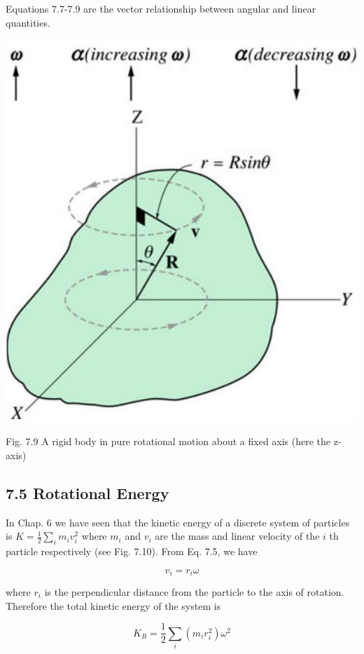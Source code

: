 \documentclass[10pt]{article}
\begin{document}
Equations 7.7-7.9 are the vector relationship between angular and linear quantities.

\begin{center}
\includegraphics[max width=\textwidth]{2024_09_13_db1f357d2aad0a03eb2eg-116}
\end{center}

Fig. 7.9 A rigid body in pure rotational motion about a fixed axis (here the z-axis)

\subsection*{7.5 Rotational Energy}
In Chap. 6 we have seen that the kinetic energy of a discrete system of particles is $K=\frac{1}{2} \sum_{i} m_{i} v_{i}^{2}$ where $m_{i}$ and $v_{i}$ are the mass and linear velocity of the $i$ th particle respectively (see Fig. 7.10). From Eq. 7.5, we have

$$
v_{i}=r_{i} \omega
$$

where $r_{i}$ is the perpendicular distance from the particle to the axis of rotation. Therefore the total kinetic energy of the system is

$$
K_{R}=\frac{1}{2} \sum_{i}\left(m_{i} r_{i}^{2}\right) \omega^{2}
$$
\end{document}
